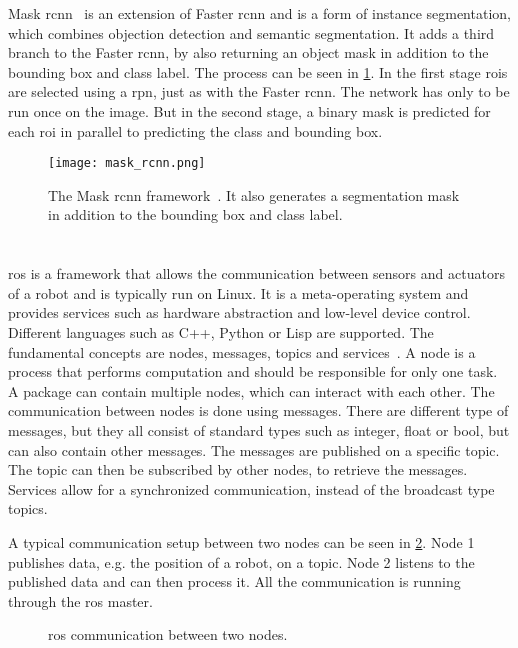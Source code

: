 Mask \gls{rcnn}~\cite{He2017} is an extension of Faster \gls{rcnn} and is a form of instance segmentation, which combines objection detection and semantic segmentation.
It adds a third branch to the Faster \gls{rcnn}, by also returning an object mask in addition to the bounding box and class label.
The process can be seen in \cref{fig:mask_rcnn}.
In the first stage \glspl{roi} are selected using a \gls{rpn}, just as with the Faster \gls{rcnn}.
The network has only to be run once on the image.
But in the second stage, a binary mask is predicted for each \gls{roi} in parallel to predicting the class and bounding box.
\begin{figure}[htbp]
    \centering
    \texttt{[image: mask\_rcnn.png]}
    \caption[Mask \acrshort{rcnn} framework]{The Mask \acrshort{rcnn} framework~\cite{He2017}. It also generates a segmentation mask in addition to the bounding box and class label.}
    \label{fig:mask_rcnn}
\end{figure}



\section{}
\label{sec:ros}
\acrfull{ros} is a framework that allows the communication between sensors and actuators of a robot and is typically run on Linux.
It is a meta-operating system and provides services such as hardware abstraction and low-level device control.
Different languages such as C++, Python or Lisp are supported.
The fundamental concepts are nodes, messages, topics and services~\cite{Quigley2009}.
A node is a process that performs computation and should be responsible for only one task.
A package can contain multiple nodes, which can interact with each other.
The communication between nodes is done using messages.
There are different type of messages, but they all consist of standard types such as integer, float or bool, but can also contain other messages.
The messages are published on a specific topic.
The topic can then be subscribed by other nodes, to retrieve the messages.
Services allow for a synchronized communication, instead of the broadcast type topics.\par
A typical communication setup between two nodes can be seen in \cref{fig:ros_framework}.
Node 1 publishes data, e.g. the position of a robot, on a topic.
Node 2 listens to the published data and can then process it.
All the communication is running through the \gls{ros} master.
\begin{figure}[htb]
    \centering
    
    \caption[\acrshort{ros} communication]{\acrshort{ros} communication between two nodes.}
    \label{fig:ros_framework}
\end{figure}